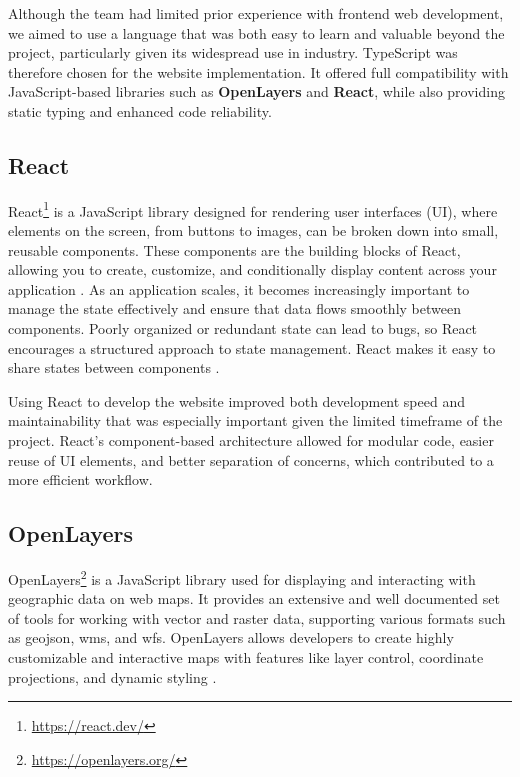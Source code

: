 Although the team had limited prior experience with frontend web development, we aimed to use a language that was both easy to learn and valuable beyond the project, particularly given its widespread use in industry. TypeScript was therefore chosen for the website implementation. It offered full compatibility with JavaScript-based libraries such as \textbf{OpenLayers} and \textbf{React}, while also providing static typing and enhanced code reliability.

\subsection{React}\label{subsec:implementation:technologies:react}

React\footnote{\url{https://react.dev/}} is a JavaScript library designed for rendering user interfaces (UI), where elements on the screen, from buttons to images, can be broken down into small, reusable components. These components are the building blocks of React, allowing you to create, customize, and conditionally display content across your application \cite{react_component}. As an application scales, it becomes increasingly important to manage the state effectively and ensure that data flows smoothly between components. Poorly organized or redundant state can lead to bugs, so React encourages a structured approach to state management. React makes it easy to share states between components \cite{react_managing_state}. 

Using React to develop the website improved both development speed and maintainability that was especially important given the limited timeframe of the project. React's component-based architecture allowed for modular code, easier reuse of UI elements, and better separation of concerns, which contributed to a more efficient workflow.

\subsection{OpenLayers}

OpenLayers\footnote{\url{https://openlayers.org/}} is a JavaScript library used for displaying and interacting with geographic data on web maps. It provides an extensive and well documented set of tools for working with vector and raster data, supporting various formats such as \Gls{geojson}, \Gls{wms}, and \Gls{wfs}. OpenLayers allows developers to create highly customizable and interactive maps with features like layer control, coordinate projections, and dynamic styling \cite{openlayers}.

